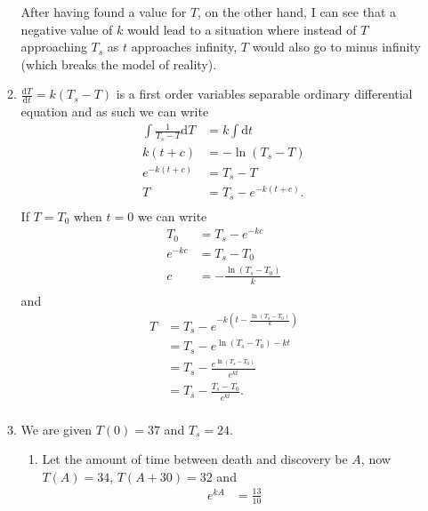 \documentclass[10pt]{article}
\newcommand*{\dt}[0]{\text{d}t}
\newcommand*{\dT}[0]{\text{d}T}
\newcommand*{\df}[2]{\frac{\text{d}{#1}}{\text{d}{#2}}}%
\begin{document}
\begin{enumerate}
\begin{enumerate}
                After having found a value for $T$, on the other hand, I can
                see that a negative value of $k$ would lead to a situation
                where instead of $T$ approaching $T_s$ as $t$ approaches
                infinity, $T$ would also go to minus infinity (which breaks the
                model of reality).
            \item $\df{T}{t} = k(T_s - T)$ is a first order variables separable
                ordinary differential equation and as such we can write
                \begin{align*}
                    \int\frac{1}{T_s - T}\dT &= k\int \dt \\
                    k(t + c) &= -\ln(T_s - T) \\
                    e^{-k(t + c)} &= T_s - T \\
                    T &= T_s - e^{-k(t+c)}. \\
                \end{align*}
            If $T = T_0$ when $t = 0$ we can write
                \begin{align*}
                    T_0 &= T_s - e^{-kc} \\
                    e^{-kc} &= T_s - T_0 \\
                    c &= -\frac{\ln(T_s - T_0)}{k} \\
                \end{align*}
                and
                \begin{align*}
                    T &= T_s - e^{-k\left(t-\tfrac{\ln(T_s - T_0)}{k}\right)} \\
                      &= T_s - e^{\ln(T_s - T_0)-kt} \\
                      &= T_s - \frac{e^{\ln(T_s - T_0)}}{e^{kt}} \\
                      &= T_s - \frac{T_s - T_0}{e^{kt}}. \\
                \end{align*}
            \item We are given $T(0) = 37$ and $T_s = 24$. 
                \begin{enumerate}
                    \item Let the amount of time between death and discovery be
                        $A$, now $T(A) = 34$, $T(A + 30) = 32$ and
                    \begin{align*}
                        e^{kA} &= \frac{13}{10} \\

\end{align*}
\end{enumerate}
\end{enumerate}
\end{enumerate}
\end{document}
